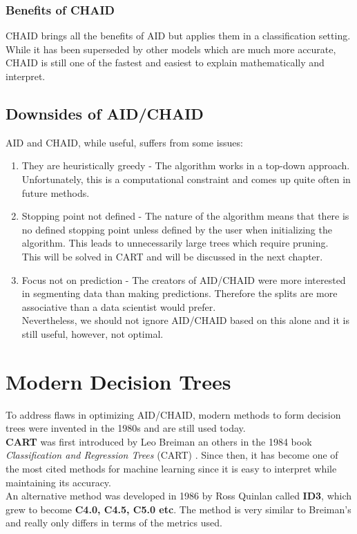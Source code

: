 \documentclass[11pt,a4paper]{report}
\begin{document}
\subsection{Benefits of CHAID}
CHAID brings all the benefits of AID but applies them in a classification setting. While it has been superseded by other models which are much more accurate, CHAID is still one of the fastest and easiest to explain mathematically and interpret.



\section{Downsides of AID/CHAID}
AID and CHAID, while useful, suffers from some issues:
\begin{enumerate}
    \item They are heuristically greedy - The algorithm works in a top-down approach.\\
    Unfortunately, this is a computational constraint and comes up quite often in future methods.
    
    \item Stopping point not defined - The nature of the algorithm means that there is no defined stopping point unless defined by the user when initializing the algorithm. This leads to unnecessarily large trees which require pruning.\\
    This will be solved in CART and will be discussed in the next chapter.
    
    \item Focus not on prediction - The creators of AID/CHAID were more interested in segmenting data than making predictions. Therefore the splits are more associative than a data scientist would prefer.\\
    Nevertheless, we should not ignore AID/CHAID based on this alone and it is still useful, however, not optimal.
\end{enumerate}

\chapter{Modern Decision Trees}
To address flaws in optimizing AID/CHAID, modern methods to form decision trees were invented in the 1980s and are still used today.\\
\textbf{CART} was first introduced by Leo Breiman an others in the 1984 book \textit{Classification and Regression Trees} (CART) \cite{BreimanDT}.
Since then, it has become one of the most cited methods for machine learning since it is easy to interpret while maintaining its accuracy.\\
An alternative method was developed in 1986 by Ross Quinlan \cite{Quinlan} called \textbf{ID3}, which grew to become \textbf{C4.0, C4.5, C5.0 etc}. The method is very similar to Breiman's and really only differs in terms of the metrics used.
\end{document}
